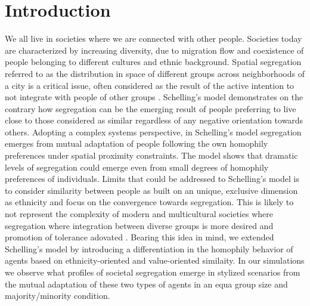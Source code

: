 \documentclass{ws-acs}
\begin{document}
\section{Introduction}
We all live in societies where we are connected with other people. Societies today are characterized by increasing diversity, due to migration flow and coexistence of people belonging to different cultures and ethnic background. Spatial segregation referred to as the distribution in space of different groups across neighborhoods of a city \cite{clark2015} is a critical issue, often considered as the result of the active intention to not integrate with people of other groups \cite{clark2008}. Schelling's model \cite{schelling69} demonstrates on the contrary how segregation can be the emerging result of people preferring to live close to those considered as similar regardless of any negative orientation towards others. Adopting a complex systems perspective, in Schelling's model segregation emerges from mutual adaptation of people following the own homophily preferences under spatial proximity constraints.  The model shows that dramatic levels of segregation could emerge even from small degrees of homophily preferences of individuals. Limits that could be addressed to Schelling's model is to consider similarity between people as built on an unique, exclusive dimension as ethnicity and focus on the convergence towards segregation. This is likely to not represent the complexity of modern and multicultural societies where segregation where integration between diverse groups is more desired and promotion of tolerance adovated \cite{verkuyten2010}. Bearing this idea in mind, we extended Schelling's model by introducing a differentiation in the homophily behavior of agents based on ethnicity-oriented and value-oriented similaity. In our simulations we observe what profiles of societal segregation emerge in stylized scenarios from the mutual adaptation of these two types of agents in an equa group size and majority/minority condition.
\end{document}
